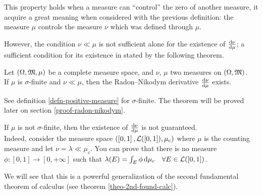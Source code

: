 This property holds when a measure can ``control'' the zero of another measure, it acquire a great meaning when considered with the previous definition: the measure $\mu$ controls the measure $\nu$ which was defined through $\mu$.

However, the condition $\nu \ll \mu$ is not sufficient alone for the existence of $\frac{\mathrm d\nu}{\mathrm d\mu}$; a sufficient condition for its existence in stated by the following theorem.

\begin{theo}  \label{theo-radon-nikodym}
	Let $(\Omega, \mathfrak M,\mu)$ be a complete measure space, and $\nu$, $\mu$ two measures on $(\Omega, \mathfrak M)$.\\
	If $\mu$ is $\sigma$-finite and $\nu\ll\mu$, then the Radon--Nikodym derivative $\frac{\mathrm d\nu}{\mathrm d\mu}$ exists.
\end{theo} 

See definition \vref{defn-positive-measure} for $\sigma$-finite. The theorem will be proved later on section \vref{proof-radon-nikodym}.

If $\mu$ is not $\sigma$-finite, then the existence of $\frac{\mathrm d\nu}{\mathrm d\mu}$ is not guaranteed.\\	
Indeed, consider the measure space $(\left[0,1\right],\mathcal L(\left[0,1\right]),\mu_c)$
where $\mu$ is the counting measure and let $\nu =\lambda\ll\mu_c$.
You can prove that there is no measure $\phi:\left[0,1\right] \to \left[0,+\infty\right]$ such that $\lambda(E) = \int_E \phi \, \mathrm d \mu_c \quad \forall E \in \mathcal L(\left[0,1]\right)$.
	
We will see that this is a powerful generalization of the second fundamental theorem of calculus (see theorem \vref{theo-2nd-found-calc}).
%
%
%
%
%
%
